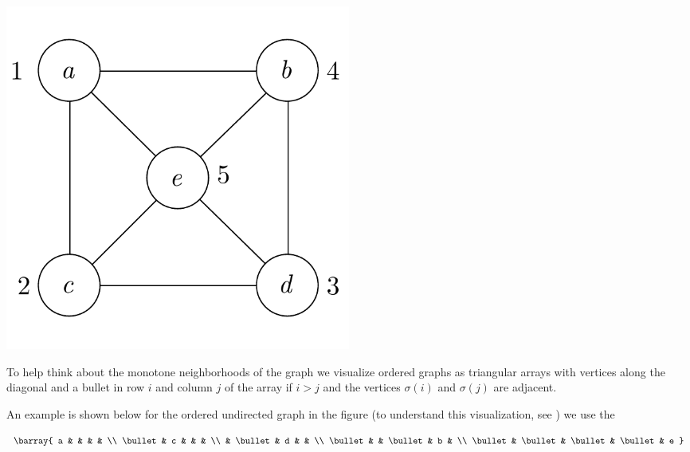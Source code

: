 \begin{center}\includegraphics[width=0.50\textwidth]{./graphics/orderedundirectedgraph.pdf}\end{center}
%    


To help think about the monotone neighborhoods of the graph we visualize ordered graphs as triangular arrays with vertices along the diagonal and a bullet in row $i$ and column $j$ of the array if $i > j$ and the vertices $\sigma (i)$ and $\sigma (j)$ are adjacent.

An example is shown below for the ordered undirected graph in the figure (to understand this visualization, see ) we use the

\[
\barray{
a & & & & \\
\bullet & c & & & \\
& \bullet & d & & \\
\bullet & & \bullet & b & \\
\bullet & \bullet & \bullet & \bullet & e
}
\]

